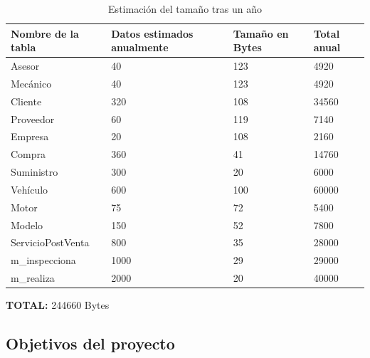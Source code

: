 \documentclass[12pt]{article}
\begin{document}
\begin{table}[h]
    \centering
    \begin{tabular}{|l|l|l|l|}
    \hline
    \textbf{Nombre de la tabla} & \textbf{Datos estimados anualmente} & \textbf{Tamaño en Bytes} & \textbf{Total anual} \\ \hline
    Asesor                      & 40         & 123 & 4920                                   \\ \hline
    Mecánico                    & 40         & 123 & 4920                                   \\ \hline
    Cliente                     & 320        & 108 & 34560                                  \\ \hline
    Proveedor                   & 60         & 119 & 7140                                   \\ \hline
    Empresa                     & 20         & 108 & 2160                                   \\ \hline
    Compra                      & 360        & 41 & 14760                                 \\ \hline
    Suministro                  & 300        & 20 & 6000                                   \\ \hline
    Vehículo                    & 600        & 100 & 60000                                   \\ \hline
    Motor                       & 75         & 72 & 5400                                    \\ \hline
    Modelo                      & 150        & 52 & 7800                                    \\ \hline
    ServicioPostVenta           & 800        & 35  & 28000                                  \\ \hline
    m\_inspecciona              & 1000       & 29  & 29000                                  \\ \hline
    m\_realiza                  & 2000       & 20 & 40000                                   \\ \hline
    \end{tabular}
    \caption{Estimación del tamaño tras un año}
\end{table}

\textbf{TOTAL:} 244660 Bytes

\newpage

\subsection{Objetivos del proyecto}
\end{document}
